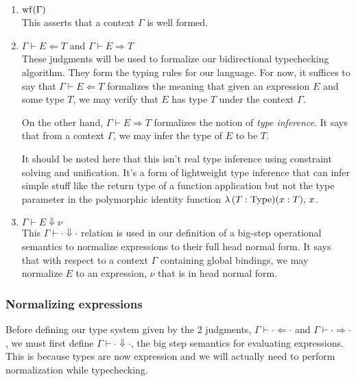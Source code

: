 \documentclass{article}
\begin{document}
\begin{enumerate}
\item $\operatorname{wf}(\Gamma)$ \\
  This asserts that a context $\Gamma$ is well formed.

\item $\Gamma \vdash E \Leftarrow T$ and $\Gamma \vdash E \Rightarrow T$ \\
  These judgments will be used to formalize our bidirectional typechecking
  algorithm. They form the typing rules for our language.
  For now, it suffices to say that $\Gamma \vdash E \Leftarrow T$ formalizes the
  meaning that given an expression $E$ and some type $T$, we may verify that
  $E$ has type $T$ under the context $\Gamma$.

  On the other hand, $\Gamma \vdash E \Rightarrow T$ formalizes the notion of
  \textit{type inference}. It says that from a context $\Gamma$, we may infer
  the type of $E$ to be $T$. 
  
  It should be noted here that this isn't real type
  inference using constraint solving and unification. It's a form of lightweight
  type inference that can infer simple stuff like the return type of a function
  application but not the type parameter in the polymorphic identity function
  $\lambda \, (T : \operatorname{Type}) (x : T), \, x$.

\item $\Gamma \vdash E \Downarrow \nu$ \\
  This $\Gamma \vdash \cdot \Downarrow \cdot$ relation is used in our definition of a
  big-step operational semantics to normalize expressions to their full head
  normal form.
  It says that with respect to a context $\Gamma$ containing global bindings, we
  may normalize $E$ to an expression, $\nu$ that is in head normal form.
\end{enumerate}

\subsubsection{Normalizing expressions}
Before defining our type system given by the 2 judgments,
$\Gamma \vdash \cdot \Leftarrow \cdot$ and $\Gamma \vdash \cdot \Rightarrow
\cdot$, we must first define $\Gamma \vdash \cdot \Downarrow \cdot$, the big
step semantics for evaluating expressions. This is because types are now
expression and we will actually need to perform normalization while
typechecking.
\end{document}
